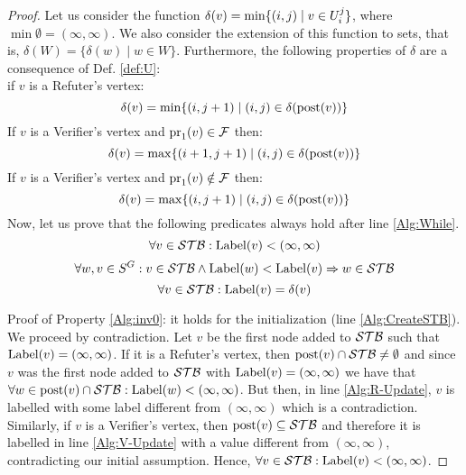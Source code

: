 \begin{proof}
	Let us consider the function  $\delta(v) = \min \{(i,j) \mid v \in U^j_i\}$, where $\min \emptyset = (\infty, \infty)$.
We also consider the extension of this function to sets, that is, $\delta(W) = \{\delta(w) \mid w \in W \}$. 
Furthermore, the following properties of $\delta$ are a consequence of Def. \ref{def:U}: \\

\noindent
if $v$ is a Refuter's vertex:
\begin{equation}\label{prop:delta-1}
 \delta(v)  = \min \{(i,j+1) \mid (i,j) \in \delta(\operatorname{post}(v)) \}
\end{equation}
If $v$ is a Verifier's vertex and $\operatorname{pr}_{1}(v) \in \mathcal{F}$ then:
\begin{equation}\label{prop:delta-2}
 \delta(v)  = \max \{(i+1,j+1) \mid (i,j) \in \delta(\operatorname{post}(v)) \}
\end{equation}
If $v$ is a Verifier's vertex and $\operatorname{pr}_{1}(v) \notin \mathcal{F}$ then:
\begin{equation}\label{prop:delta-3}
 \delta(v) = \max \{(i,j+1) \mid (i,j) \in \delta(\operatorname{post}(v)) \}
\end{equation}
	Now, let us prove that the following predicates always hold after line \ref{Alg:While}.
\begin{equation}\label{Alg:inv0}
	\forall v \in \mathcal{STB} : \operatorname{Label}(v) < (\infty, \infty)
\end{equation}
\begin{equation}\label{Alg:inv1}
	\forall w, v \in S^G : v \in \mathcal{STB} \wedge \operatorname{Label}(w) < \operatorname{Label}(v) \Rightarrow w \in \mathcal{STB}
\end{equation}
\begin{equation}\label{Alg:inv2}
	\forall v \in \mathcal{STB} : \operatorname{Label}(v) = \delta(v)
\end{equation}

	Proof of Property \ref{Alg:inv0}: it holds for the initialization (line \ref{Alg:CreateSTB}). We proceed by contradiction. 
Let $v$ be the first node added to $\mathcal{STB}$ such that $\operatorname{Label}(v) = (\infty, \infty)$.
If it is a Refuter's vertex, then $\operatorname{post}(v) \cap \mathcal{STB} \neq \emptyset$ and since $v$ was the first node added to $\mathcal{STB}$ with 
$\operatorname{Label}(v) = (\infty, \infty)$ we have that $\forall w \in \operatorname{post}(v) \cap \mathcal{STB}: \operatorname{Label}(w) < (\infty, \infty)$. But then, in line \ref{Alg:R-Update},
$v$ is labelled with some label different from $(\infty, \infty)$ which is a contradiction. 
Similarly, if $v$ is a Verifier's vertex, then $\operatorname{post}(v) \subseteq \mathcal{STB}$ and 
therefore it is labelled in line \ref{Alg:V-Update} with a value different from $(\infty, \infty)$, contradicting our initial assumption. 
Hence, $\forall v \in \mathcal{STB} : \operatorname{Label}(v) < (\infty, \infty)$.


\end{proof}
